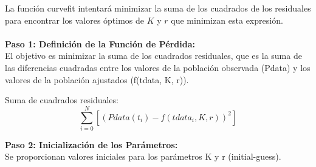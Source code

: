 \documentclass{beamer}
\begin{document}
\begin{frame}
    \small{La función curvefit intentará minimizar la suma de los cuadrados de los residuales para encontrar los valores óptimos de $K$ y $r$ que minimizan esta expresión.} \\\\
    \textbf{Paso 1: Definición de la Función de Pérdida:\\}
    \small{El objetivo es minimizar la suma de los cuadrados residuales, que es la suma de las diferencias cuadradas entre los valores de la población observada (Pdata) y los valores de la población ajustados (f(tdata, K, r)).\\}
    \begin{block}{Suma de cuadrados residuales:}
        $$\sum_{i=0}^{N}[(Pdata(t_{i}) - f(tdata_{i}, K, r))^2]$$
    \end{block}
    \textbf{Paso 2: Inicialización de los Parámetros:}\\
    Se proporcionan valores iniciales para los parámetros K y r (initial-guess).\\
\end{frame}
\end{document}
